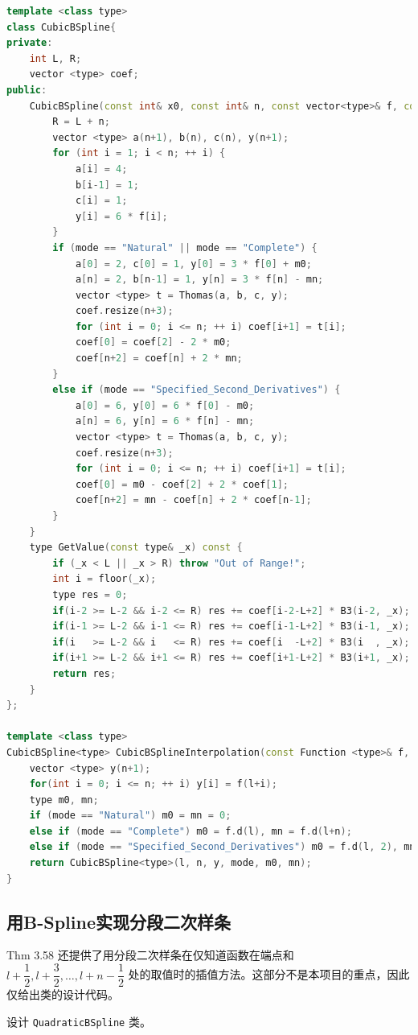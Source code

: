 \documentclass{ctexart}
\begin{document}
\begin{lstlisting}[language={c++}]
template <class type>
class CubicBSpline{
private:
	int L, R;
	vector <type> coef;
public:
	CubicBSpline(const int& x0, const int& n, const vector<type>& f, const string& mode = "Natural", const type& m0 = 0, const type& mn = 0) : L(x0) {
		R = L + n;
		vector <type> a(n+1), b(n), c(n), y(n+1);
		for (int i = 1; i < n; ++ i) {
			a[i] = 4;
			b[i-1] = 1;
			c[i] = 1;
			y[i] = 6 * f[i];
		}
		if (mode == "Natural" || mode == "Complete") {
			a[0] = 2, c[0] = 1, y[0] = 3 * f[0] + m0;
			a[n] = 2, b[n-1] = 1, y[n] = 3 * f[n] - mn;
			vector <type> t = Thomas(a, b, c, y);
			coef.resize(n+3);
			for (int i = 0; i <= n; ++ i) coef[i+1] = t[i];
			coef[0] = coef[2] - 2 * m0;
			coef[n+2] = coef[n] + 2 * mn;
		}
		else if (mode == "Specified_Second_Derivatives") {
			a[0] = 6, y[0] = 6 * f[0] - m0;
			a[n] = 6, y[n] = 6 * f[n] - mn;
			vector <type> t = Thomas(a, b, c, y);
			coef.resize(n+3);
			for (int i = 0; i <= n; ++ i) coef[i+1] = t[i];
			coef[0] = m0 - coef[2] + 2 * coef[1];
			coef[n+2] = mn - coef[n] + 2 * coef[n-1];
		}
	}
	type GetValue(const type& _x) const {
		if (_x < L || _x > R) throw "Out of Range!";
		int i = floor(_x);
		type res = 0;
		if(i-2 >= L-2 && i-2 <= R) res += coef[i-2-L+2] * B3(i-2, _x);
		if(i-1 >= L-2 && i-1 <= R) res += coef[i-1-L+2] * B3(i-1, _x);
		if(i   >= L-2 && i   <= R) res += coef[i  -L+2] * B3(i  , _x);
		if(i+1 >= L-2 && i+1 <= R) res += coef[i+1-L+2] * B3(i+1, _x);
		return res;
	}
};

template <class type>
CubicBSpline<type> CubicBSplineInterpolation(const Function <type>& f, const int& l, const int& n, const string& mode = "Natural") {
	vector <type> y(n+1);
	for(int i = 0; i <= n; ++ i) y[i] = f(l+i);
	type m0, mn;
	if (mode == "Natural") m0 = mn = 0;
	else if (mode == "Complete") m0 = f.d(l), mn = f.d(l+n);
	else if (mode == "Specified_Second_Derivatives") m0 = f.d(l, 2), mn = f.d(l+n, 2);
	return CubicBSpline<type>(l, n, y, mode, m0, mn);
}
\end{lstlisting}

\subsection{用B-Spline实现分段二次样条}

Thm 3.58 还提供了用分段二次样条在仅知道函数在端点和 $l+\dfrac 12,l+\dfrac 32,\dots,l+n-\dfrac 12$ 处的取值时的插值方法。这部分不是本项目的重点，因此仅给出类的设计代码。

设计 \verb|QuadraticBSpline| 类。
\end{document}
